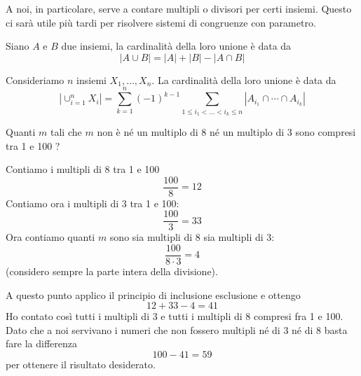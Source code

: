 A noi, in particolare, serve a contare multipli o divisori per certi insiemi. Questo ci sar\`a
utile pi\`u tardi per risolvere sistemi di congruenze con parametro.

\begin{theorem}
	Siano $A$ e $B$ due insiemi, la cardinalit\`a della loro unione \`e data da
	\begin{equation*}
		|A \cup B| = |A| + |B| - |A \cap B|
	\end{equation*}
\end{theorem}

\begin{theorem}
	Consideriamo $n$ insiemi $X_1, \dots, X_n$. La cardinalit\`a della loro unione \`e
	data da
	\begin{equation*}
		|\cup_{i = 1}^n X_i| = \sum_{k=1}^n (-1)^{k-1}
		\sum_{1 \leq i_1 < \dots < i_k \leq n}
		|A_{i_1} \cap \cdots \cap A_{i_k}|
	\end{equation*}
\end{theorem}

\begin{example}
	Quanti $m$ tali che $m$ non \`e n\'e un multiplo di 8 n\'e un multiplo di 3 sono compresi
	tra 1 e 100 ?

	Contiamo i multipli di 8 tra 1 e 100
	\begin{equation*}
		\frac{100}{8} = 12
	\end{equation*}
	Contiamo ora i multipli di 3 tra 1 e 100:
	\begin{equation*}
		\frac{100}{3} = 33
	\end{equation*}
	Ora contiamo quanti $m$ sono sia multipli di 8 sia multipli di 3:
	\begin{equation*}
		\frac{100}{8 \cdot 3} = 4
	\end{equation*}
	(considero sempre la parte intera della divisione).

	A questo punto applico il principio di inclusione esclusione e ottengo
	\begin{equation*}
		12 + 33 - 4 = 41
	\end{equation*}
	Ho contato cos\`i tutti i multipli di 3 e tutti i multipli di 8 compresi fra 1 e 100.
	Dato che a noi servivano i numeri che non fossero multipli n\'e di 3 n\'e di 8 basta
	fare la differenza
	\begin{equation*}
		100 - 41 = 59
	\end{equation*}
	per ottenere il risultato desiderato.
\end{example}

